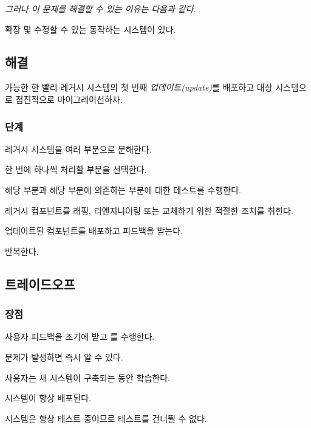 \documentclass[a4paper,10pt,twoside]{book}
\begin{document}
\emph{그러나 이 문제를 해결할 수 있는 이유는 다음과 같다.}

\begin{bulletlist}
\item 확장 및 수정할 수 있는 동작하는 시스템이 있다.
\end{bulletlist}

\subsection*{해결}

가능한 한 빨리 레거시 시스템의 첫 번째 \emph{업데이트(update)}를 배포하고 대상 시스템으로 점진적으로 마이그레이션하자.

\subsubsection*{단계}

\begin{bulletlist}
\item 레거시 시스템을 여러 부분으로 분해한다.

\item 한 번에 하나씩 처리할 부분을 선택한다.

\item 해당 부분과 해당 부분에 의존하는 부분에 대한 테스트를 수행한다.

\item 레거시 컴포넌트를 래핑, 리엔지니어링 또는 교체하기 위한 적절한 조치를 취한다.

\item 업데이트된 컴포넌트를 배포하고 피드백을 받는다.

\item 반복한다.
\end{bulletlist}

\subsection*{트레이드오프}

\subsubsection*{장점}

\begin{bulletlist}
\item 사용자 피드백을 조기에 받고 를 수행한다.

\item 문제가 발생하면 즉시 알 수 있다.

\item 사용자는 새 시스템이 구축되는 동안 학습한다.

\item 시스템이 항상 배포된다.

\item 시스템은 항상 테스트 중이므로 테스트를 건너뛸 수 없다.
\end{bulletlist}
\end{document}
